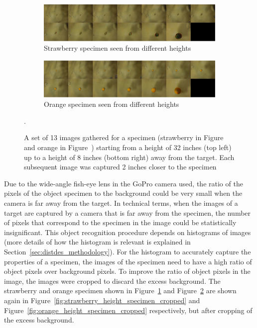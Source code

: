 \documentclass {udthesis}
\begin{document}
\begin{figure}
  \centering
  \begin{subfigure}[]{\textwidth}
      \includegraphics[width=\textwidth]{strawberry_distance_montage.eps}
      \caption{Strawberry specimen seen from different heights}
      \label{fig:strawberry_height_specimen}
  \end{subfigure}
  \begin{subfigure}[]{\textwidth}
      \includegraphics[width=\textwidth]{orange_distance_montage.eps}
      \caption{Orange specimen seen from different heights}
      \label{fig:orange_height_specimen}
  \end{subfigure}
\caption[Set of images collected for each specimen from different heights]{A set of 13 images gathered for a specimen (strawberry in Figure~ and orange in Figure~) starting from a height of 32 inches (top left) up to a height of 8 inches (bottom right) away from the target.
Each subsequent image was captured 2 inches closer to the specimen}.
\label{fig:height_specimen}
\end{figure}	
%
Due to the wide-angle fish-eye lens in the GoPro camera used, the ratio of the pixels of the object specimen to the background could be very small when the camera is far away from the target. In technical terms, when the images of a target are captured by a camera that is far away from the specimen, the number of pixels that correspond to the specimen in the image could be statistically insignificant. This object recognition procedure depends on histograms of images (more details of how the histogram is relevant is explained in Section~\ref{sec:distdes_methodology}). 
For the histogram to accurately capture the properties of a specimen, the images of the specimen need to have a high ratio of object pixels over background pixels. To improve the ratio of object pixels in the image, the images were cropped to discard the excess background. The strawberry and orange specimen shown in Figure~\ref{fig:strawberry_height_specimen} and Figure~\ref{fig:orange_height_specimen} are shown again in Figure~\ref{fig:strawberry_height_specimen_cropped} and 
Figure~\ref{fig:orange_height_specimen_cropped} respectively, but after cropping of the excess background.
\end{document}

